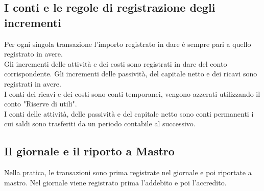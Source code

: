 \documentclass{report}
\begin{document}
	\subsection{I conti e le regole di registrazione degli incrementi}
	Per ogni singola transazione l'importo registrato in dare è sempre pari a quello registrato in avere. \medskip \\Gli incrementi delle attività e dei costi sono registrati in dare del conto corrispondente. Gli incrementi delle passività, del capitale netto e dei ricavi sono registrati in avere. \medskip \\I conti dei ricavi e dei costi sono conti temporanei, vengono azzerati utilizzando il conto "Riserve di utili".\medskip \\I conti delle attività, delle passività e del capitale netto sono conti permanenti i cui saldi sono trasferiti da un periodo contabile al successivo.
	\subsection{Il giornale e il riporto a Mastro}
	Nella pratica, le transazioni sono prima registrate nel giornale e poi riportate a mastro. Nel giornale viene registrato prima l'addebito e poi l'accredito.
\end{document}
